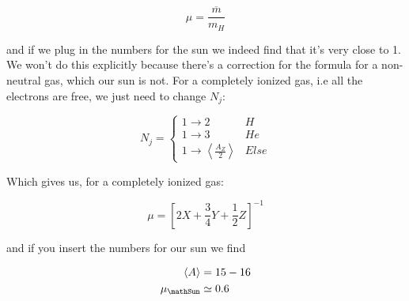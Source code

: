 \begin{equation}
	\mu = \frac{\overline{m}}{m_H}
\end{equation}

and if we plug in the numbers for the sun we indeed find that it's very close to 1. We won't do this explicitly because there's a correction for the formula for a non-neutral gas, which our sun is not. For a completely ionized gas, i.e all the electrons are free, we just need to change $N_j$:

\begin{equation}
	N_j = \begin{cases}
		1\rightarrow2 & H\\
		1\rightarrow3 & He\\
		1\rightarrow\left\langle\frac{A_Z}{2}\right\rangle & Else
	\end{cases}
\end{equation}

Which gives us, for a completely ionized gas:

\begin{equation}
	\mu = \left[2X+\frac{3}{4}Y+\frac{1}{2}Z\right]^{-1}
\end{equation}

and if you insert the numbers for our sun we find

\begin{align}
	\left\langle A\right\rangle &= 15-16\\
	\mu_\mathSun &\simeq 0.6
\end{align}
